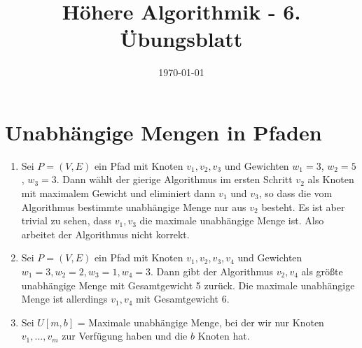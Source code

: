 \documentclass[a4paper,10pt]{scrartcl}
\title{H\"ohere Algorithmik - 6. \"Ubungsblatt}
\author{\Authors}
\date{\today}
\begin{document}
\maketitle

\section{Unabhängige Mengen in Pfaden}
\begin{enumerate}
 \item Sei $P = (V,E)$ ein Pfad mit Knoten $v_1, v_2, v_3$ und Gewichten
 $w_1 = 3$, $w_2 = 5$, $w_3 = 3$. Dann wählt der gierige Algorithmus im
 ersten Schritt $v_2$ als Knoten mit maximalem Gewicht und eliminiert
 dann $v_1$ und $v_3$, so dass die vom Algorithmus bestimmte unabhängige
 Menge nur aus $v_2$ besteht. Es ist aber trivial zu sehen, dass ${v_1,v_3}$ die
 maximale unabhängige Menge ist. Also
 arbeitet der Algorithmus nicht korrekt.
 \item Sei $P = (V,E)$ ein Pfad mit Knoten $v_1, v_2, v_3, v_4$ und
 Gewichten $w_1 = 3, w_2 = 2, w_3 = 1, w_4 = 3$. Dann gibt der
 Algorithmus ${v_2,v_4}$ als größte unabhängige Menge mit Gesamtgewicht
 5 zurück. Die maximale unabhängige Menge ist allerdings ${v_1,v_4}$ mit
 Gesamtgewicht 6.
 \item Sei $U[m,b]$ = Maximale unabhängige Menge, bei der wir nur Knoten
 $v_1,...,v_m$ zur Verfügung haben und die $b$ Knoten hat.
\end{enumerate}
\end{document}
